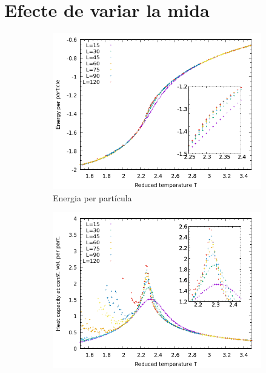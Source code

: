 \documentclass[a4paper]{article}
\begin{document}
\section{Efecte de variar la mida}

\begin{figure}[H]
    \centering
    \begin{subfigure}{.45\textwidth}
        \centering
        \includegraphics[width=\textwidth]{plot-e.png}
        \caption{Energia per partícula}
        \label{fig:plot-e}
    \end{subfigure}
    \begin{subfigure}{.45\textwidth}
        \centering
        \includegraphics[width=\textwidth]{plot-cv.png}

\end{subfigure}
\end{figure}
\end{document}
